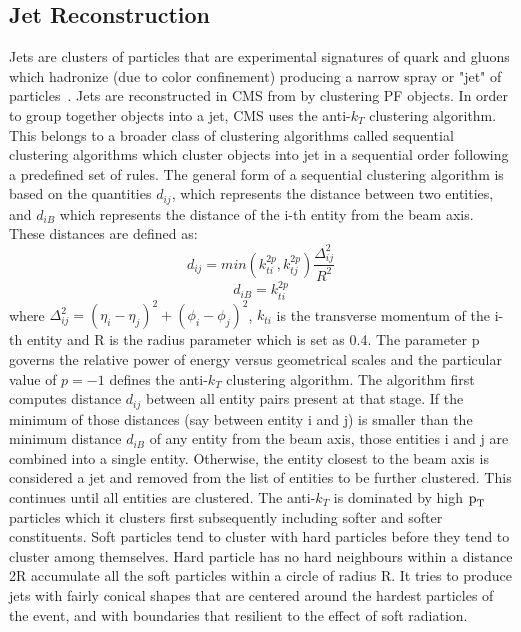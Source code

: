\subsection{Jet Reconstruction}
\label{jet_recon}
Jets are clusters of particles that are experimental signatures of quark and gluons which hadronize (due to color confinement) producing a narrow spray or "jet" of particles~\cite{jet_recon}. Jets are reconstructed in CMS from by clustering PF objects. In order to group together objects into a jet, CMS uses the anti-$k_{T}$ clustering algorithm. This belongs to a broader class of clustering algorithms called sequential clustering algorithms which cluster objects into jet in a sequential order following a predefined set of rules. The general form of a sequential clustering algorithm is based on the quantities  $d_{ij}$, which represents the distance between two entities, and $d_{iB}$ which represents the distance of the i-th entity from the beam axis. These distances are defined as:
\begin{equation*}
  d_{ij}=min(k_{ti}^{2p},k_{tj}^{2p})\frac{\Delta_{ij}^{2}}{R^2}
\end{equation*}
\begin{equation*}
  d_{iB}=k_{ti}^{2p}
\end{equation*}
where $\Delta_{ij}^{2}=(\eta_i-\eta_j)^2+(\phi_i-\phi_j)^2$, $k_{ti}$ is the transverse momentum of the i-th entity and R is the radius parameter which is set as 0.4. The parameter p governs the relative power of energy versus geometrical scales and the particular value of $p=-1$ defines the anti-$k_{T}$ clustering algorithm. The algorithm first computes distance $d_{ij}$ between all entity pairs present at that stage. If the minimum of those distances (say between entity i and j) is smaller than the minimum distance $d_{iB}$ of any entity from the beam axis, those entities i and j are combined into a single entity. Otherwise, the entity closest to the beam axis is considered a jet and removed from the list of entities to be further clustered. This continues until all entities are clustered. The anti-$k_{T}$ is dominated by high $\text{p}_\text{T}$ particles which it clusters first subsequently including softer and softer constituents. Soft particles tend to cluster with hard particles before they tend to cluster among themselves. Hard particle has no hard neighbours within a distance 2R accumulate all the soft particles within a circle of radius R. It tries to produce jets with fairly conical shapes that are centered around the hardest particles of the event, and with boundaries that resilient to the effect of soft radiation.

